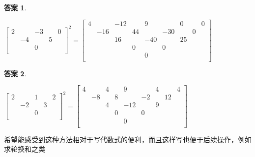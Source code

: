 \documentclass[UTF8]{ctexart}
\newtheorem{4}{答案}
\begin{document}
\begin{4}
	\begin{center}
		$ \left[\begin{matrix}
		2& &-3& &0\\
		&-4& &5&\\
		& &0& &\\
	\end{matrix}\right]^{2}=
	\left[\begin{matrix}
		4& &-12& &9& &0& &0\\
		&-16& &44& &-30& &0&\\
		& &16& &-40& &25& &\\
		& & &0& &0& & &\\
		& & & &0& & & &\\
	\end{matrix}\right] $
   \end{center}
\end{4}
\begin{4}
	\begin{center}
		$ \left[\begin{matrix}
			2& &1& &2\\
			&-2& &3&\\
			& &0& &\\
		\end{matrix}\right]^{2}=
		\left[\begin{matrix}
			4& &4& &9& &4& &4\\
			&-8& &8& &-2& &12&\\
			& &4& &-12& &9& &\\
			& & &0& &0& & &\\
			& & & &0& & & &\\
		\end{matrix}\right] $
	\end{center}
\end{4}
希望能感受到这种方法相对于写代数式的便利，而且这样写也便于后续操作，例如求轮换和之类
\end{document}
